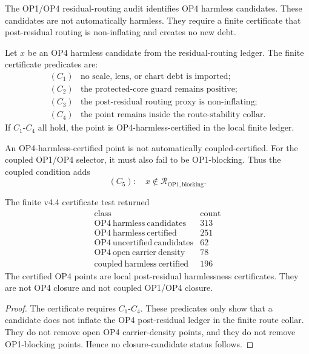 The OP1/OP4 residual-routing audit identifies OP4 harmless candidates.  These
candidates are not automatically harmless.  They require a finite certificate
that post-residual routing is non-inflating and creates no new debt.

\begin{definition}
Let \(x\) be an OP4 harmless candidate from the residual-routing ledger.  The
finite certificate predicates are:
\[
\begin{array}{ll}
(C_1) & \text{no scale, lens, or chart debt is imported;}\\
(C_2) & \text{the protected-core guard remains positive;}\\
(C_3) & \text{the post-residual routing proxy is non-inflating;}\\
(C_4) & \text{the point remains inside the route-stability collar.}
\end{array}
\]
If \(C_1\)-\(C_4\) all hold, the point is OP4-harmless-certified in the local
finite ledger.
\end{definition}

\begin{definition}
An OP4-harmless-certified point is not automatically coupled-certified.  For
the coupled OP1/OP4 selector, it must also fail to be OP1-blocking.  Thus the
coupled condition adds
\[
    (C_5):\quad x\notin \mathcal R_{\mathrm{OP1,blocking}}.
\]
\end{definition}

\begin{proposition}
The finite v4.4 certificate test returned
\[
\begin{array}{c|r}
\text{class} & \text{count}\\
\hline
\mathrm{OP4\ harmless\ candidates} & 313\\
\mathrm{OP4\ harmless\ certified} & 251\\
\mathrm{OP4\ uncertified\ candidates} & 62\\
\mathrm{OP4\ open\ carrier\ density} & 78\\
\mathrm{coupled\ harmless\ certified} & 196
\end{array}
\]
The certified OP4 points are local post-residual harmlessness certificates.
They are not OP4 closure and not coupled OP1/OP4 closure.
\end{proposition}

\begin{proof}
The certificate requires \(C_1\)-\(C_4\).  These predicates only show that a
candidate does not inflate the OP4 post-residual ledger in the finite route
collar.  They do not remove open OP4 carrier-density points, and they do not
remove OP1-blocking points.  Hence no closure-candidate status follows.
\end{proof}

